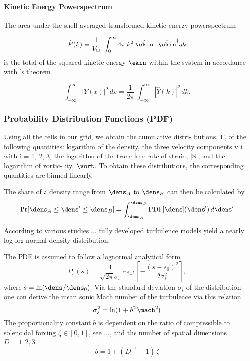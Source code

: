 \paragraph{Kinetic Energy Powerspectrum}
The area under the shell-averaged transformed kinetic energy powerspectrum

\begin{equation}
    \tilde{E}(k) = \frac{1}{V_{\Omega}} \; \int_0^\infty 4\pi\,k^2 \; \hat{\ekin} \cdot \hat{\ekin}^{\dagger} dk
\end{equation}
is the total of the squared kinetic energy $\ekin$ within the system in accordance
with 's theorem

\begin{equation}
    \int_{-\infty}^{\infty} |Y(x)|^2 \, dx = \frac{1}{2\pi} \; \int_{-\infty}^{\infty} |\hat{Y}(k)|^2 \,dk.
\end{equation}

\subsubsection{Probability Distribution Functions (PDF)}

Using all the cells in our grid, we obtain the cumulative distri-
butions, F, of the following quantities: logarithm of the density,
the three velocity components v i with i = 1, 2, 3, the logarithm
of the trace free rate of strain, |S|, and the logarithm of vortic-
ity, $\vort$. To obtain these distributions, the corresponding
quantities are binned linearly.


The share of a density range from $\dens_A$ to $\dens_B$ can then be calculated
by
\begin{equation}
    \text{Pr}[\dens_A \le \dens' \le \dens_B] = \int_{\dens_A}^{\dens_B} \text{PDF}[\dens](\dens') \, d\dens'
\end{equation}

According to various studies ... fully developed turbulence models
yield a nearly log-log normal density distribution.

The PDF is assumed to follow a lognormal analytical form
\begin{equation}
P_s(s) = \frac{1}{\sqrt{2\pi}\sigma_s} \exp\left[-\frac{(s-s_0)^2}{2\sigma_s^2}\right],
\end{equation}
where $s = \ln(\dens/\dens_0)$. Via the standard deviation $\sigma_s$ of
the distribution one can derive the mean sonic Mach number of the
turbulence via this relation
\begin{equation}
\sigma_s^2 = \ln(1 + b^2\,\mach^2)
\end{equation}
The proportionality constant $b$ is dependent on the ratio of compressible to
solenoidal forcing $\zeta \in [0,1]$, see ..., and the number of spatial
dimensions $D = 1,2,3$.
\begin{equation}
b = 1 + (D^{-1} - 1) \, \zeta
\end{equation}

